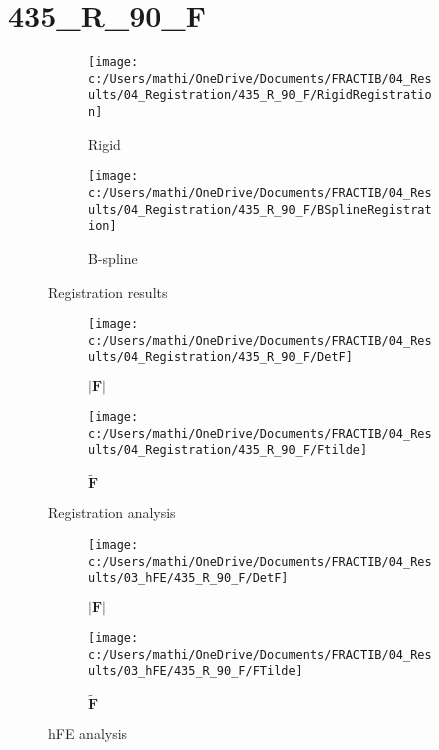 \documentclass{article}%
\begin{document}
%
\newpage%
\section*{435\_R\_90\_F}%
\label{sec:435R90F}%


\begin{figure}[h!]%
\begin{subfigure}[b]{0.5\linewidth}%
\texttt{[image: c:/Users/mathi/OneDrive/Documents/FRACTIB/04\_Results/04\_Registration/435\_R\_90\_F/RigidRegistration]}%
\caption{Rigid}%
\end{subfigure}%
\begin{subfigure}[b]{0.5\linewidth}%
\texttt{[image: c:/Users/mathi/OneDrive/Documents/FRACTIB/04\_Results/04\_Registration/435\_R\_90\_F/BSplineRegistration]}%
\caption{B{-}spline}%
\end{subfigure}%
\caption{Registration results}%
\end{figure}

%


\begin{figure}[h!]%
\begin{subfigure}[b]{0.5\linewidth}%
\texttt{[image: c:/Users/mathi/OneDrive/Documents/FRACTIB/04\_Results/04\_Registration/435\_R\_90\_F/DetF]}%
\caption{$|\mathbf{F}|$}%
\end{subfigure}%
\begin{subfigure}[b]{0.5\linewidth}%
\texttt{[image: c:/Users/mathi/OneDrive/Documents/FRACTIB/04\_Results/04\_Registration/435\_R\_90\_F/Ftilde]}%
\caption{$\tilde{\mathbf{F}}$}%
\end{subfigure}%
\caption{Registration analysis}%
\end{figure}

%


\begin{figure}[h!]%
\begin{subfigure}[b]{0.5\linewidth}%
\texttt{[image: c:/Users/mathi/OneDrive/Documents/FRACTIB/04\_Results/03\_hFE/435\_R\_90\_F/DetF]}%
\caption{$|\mathbf{F}|$}%
\end{subfigure}%
\begin{subfigure}[b]{0.5\linewidth}%
\texttt{[image: c:/Users/mathi/OneDrive/Documents/FRACTIB/04\_Results/03\_hFE/435\_R\_90\_F/FTilde]}%
\caption{$\tilde{\mathbf{F}}$}%
\end{subfigure}%
\caption{hFE analysis}%
\end{figure}
\end{document}
